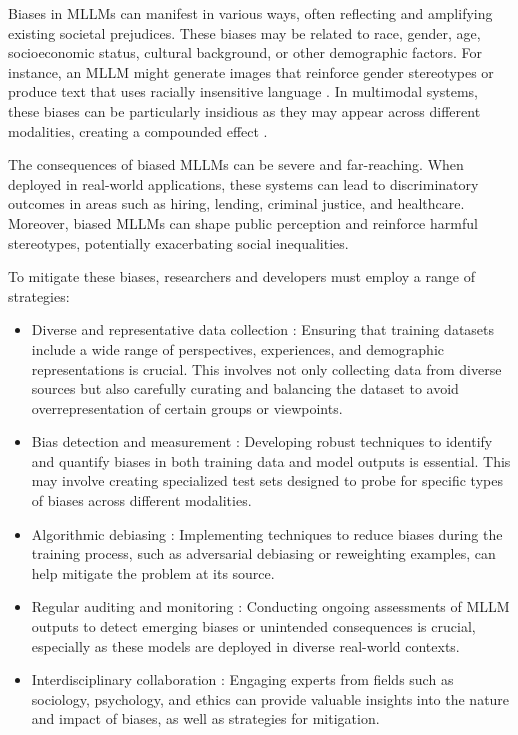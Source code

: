 Biases in MLLMs can manifest in various ways, often reflecting and amplifying existing societal prejudices. These biases may be related to race, gender, age, socioeconomic status, cultural background, or other demographic factors. For instance, an MLLM might generate images that reinforce gender stereotypes or produce text that uses racially insensitive language \cite{basta2022gender}. In multimodal systems, these biases can be particularly insidious as they may appear across different modalities, creating a compounded effect \cite{magesh2024hallucination}.

The consequences of biased MLLMs can be severe and far-reaching. When deployed in real-world applications, these systems can lead to discriminatory outcomes in areas such as hiring, lending, criminal justice, and healthcare. Moreover, biased MLLMs can shape public perception and reinforce harmful stereotypes, potentially exacerbating social inequalities.

To mitigate these biases, researchers and developers must employ a range of strategies:

\begin{itemize}
\item Diverse and representative data collection \cite{cegin2024effects}: Ensuring that training datasets include a wide range of perspectives, experiences, and demographic representations is crucial. This involves not only collecting data from diverse sources but also carefully curating and balancing the dataset to avoid overrepresentation of certain groups or viewpoints.

\item Bias detection and measurement \cite{lin2024investigating}: Developing robust techniques to identify and quantify biases in both training data and model outputs is essential. This may involve creating specialized test sets designed to probe for specific types of biases across different modalities.

\item Algorithmic debiasing \cite{owens2024multi}: Implementing techniques to reduce biases during the training process, such as adversarial debiasing or reweighting examples, can help mitigate the problem at its source.

\item Regular auditing and monitoring \cite{patil2024review}: Conducting ongoing assessments of MLLM outputs to detect emerging biases or unintended consequences is crucial, especially as these models are deployed in diverse real-world contexts.

\item Interdisciplinary collaboration \cite{jiao2024navigating}: Engaging experts from fields such as sociology, psychology, and ethics can provide valuable insights into the nature and impact of biases, as well as strategies for mitigation.

\end{itemize}

